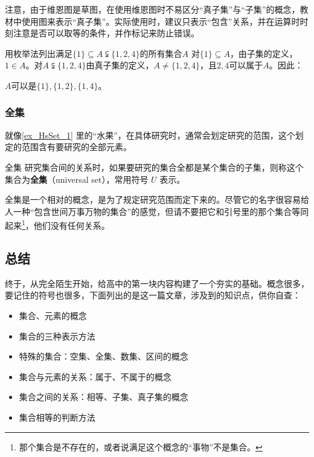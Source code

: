 注意，由于维恩图是草图，在使用维恩图时不易区分“真子集”与“子集”的概念，教材中使用图来表示“真子集”。实际使用时，建议只表示“包含”关系，并在运算时时刻注意是否可以取等的条件，并作标记来防止错误。

\begin{exercise}{用枚举法列出满足$\{1\}\subseteq A\subsetneqq\{1,2,4\}$的所有集合$A$}
对$\{1\}\subseteq A$，由子集的定义，$1\in A$。对$A\subsetneqq\{1,2,4\}$由真子集的定义，$A\neq \{1,2,4\}$，且$2,4$可以属于$A$。因此：

$A$可以是$\{1\},\{1,2\},\{1,4\}$。
\end{exercise}
\subsubsection{全集}

就像\autoref{ex_HsSet_1} 里的“水果”，在具体研究时，通常会划定研究的范围，这个划定的范围含有要研究的全部元素。

\begin{definition}{全集}
研究集合间的关系时，如果要研究的集合全都是某个集合的子集，则称这个集合为\textbf{全集}（universal set），常用符号 $U$ 表示。
\end{definition}

全集是一个相对的概念，是为了规定研究范围而定下来的。尽管它的名字很容易给人一种“包含世间万事万物的集合”的感觉，但请不要把它和引号里的那个集合等同起来\footnote{那个集合是不存在的，或者说满足这个概念的“事物”不是集合。}，他们没有任何关系。

\subsection{总结}

终于，从完全陌生开始，给高中的第一块内容构建了一个夯实的基础。概念很多，要记住的符号也很多，下面列出的是这一篇文章，涉及到的知识点，供你自查：

\begin{itemize}
\item 集合、元素的概念
\item 集合的三种表示方法
\item 特殊的集合：空集、全集、数集、区间的概念
\item 集合与元素的关系：属于、不属于的概念
\item 集合之间的关系：相等、子集、真子集的概念
\item 集合相等的判断方法
\end{itemize}
